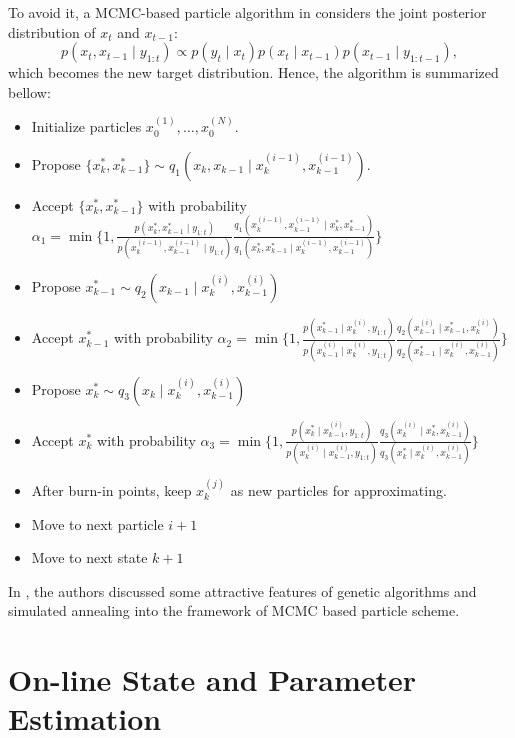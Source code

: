 To avoid it, a MCMC-based particle algorithm in \cite{pang2008models} considers the joint posterior distribution of $x_t$ and $x_{t-1}$:
\begin{equation}
p(x_t,x_{t-1}\mid y_{1:t})\propto p(y_t\mid x_t)p(x_t\mid x_{t-1})p(x_{t-1}\mid y_{1:t-1}),
\end{equation}
which becomes the new target distribution. Hence, the algorithm is summarized bellow:
\begin{itemize}
\item Initialize particles $x_0^{(1)},\dots,x_0^{(N)}$.
\item Propose $\{x_k^*,x_{k-1}^*\}\sim q_1(x_k,x_{k-1}\mid x_{k}^{(i-1)},x_{k-1}^{(i-1)})$.
\item Accept $\{x_k^*,x_{k-1}^*\}$ with probability $\alpha_1=\min\lbrace 1, \frac{ p(x_k^*,x_{k-1}^*\mid y_{1:t} )  }{ p(x_k^{(i-1)},x_{k-1}^{(i-1)}\mid y_{1:t} )  }  \frac{ q_1(x_k^{(i-1)},x_{k-1}^{(i-1)}\mid x_k^*,x_{k-1}^*)  }{ q_1(x_k^*,x_{k-1}^* \mid x_k^{(i-1)},x_{k-1}^{(i-1)})  }   \rbrace$
\item Propose $x_{k-1}^*\sim q_2(x_{k-1}\mid  x_k^{(i)},x_{k-1}^{(i)}  )$
\item Accept $x_{k-1}^*$ with probability $\alpha_2 = \min \lbrace 1, \frac{ p(x_{k-1}^*\mid x_k^{(i)},y_{1:t}) }{  p(x_{k-1}^{(i)}\mid x_{k}^{(i)},y_{1:t})  }  \frac{ q_2(x_{k-1}^{(i)} \mid x_{k-1}^*, x_k^{(i)} ) }{ q_2(x_{k-1}^*\mid x_{k}^{(i)},x_{k-1}^{(i)})    } \rbrace$
\item Propose $x_k^* \sim q_3(x_k\mid x_k^{(i)}, x_{k-1}^{(i)})$
\item Accept $x_k^*$ with probability $\alpha_3 =\min \lbrace 1,
\frac{ p(x_{k}^*\mid x_{k-1}^{(i)},y_{1:t}) }{  p(x_{k}^{(i)}\mid x_{k-1}^{(i)},y_{1:t})  }  \frac{ q_3(x_{k}^{(i)} \mid x_{k}^*, x_{k-1}^{(i)} ) }{ q_3(x_{k}^*\mid x_{k}^{(i)},x_{k-1}^{(i)}) }  \rbrace  $
\item After burn-in points, keep $x_k^{(j)}$ as new particles for approximating.
\item Move to next particle $i+1$
\item Move to next state $k+1$
\end{itemize}

In \cite{septier2009multiple}, the authors discussed some attractive features of genetic algorithms and simulated annealing into the framework of MCMC based particle scheme. 




\section{On-line State and Parameter Estimation}\label{sectionStateandPara}

